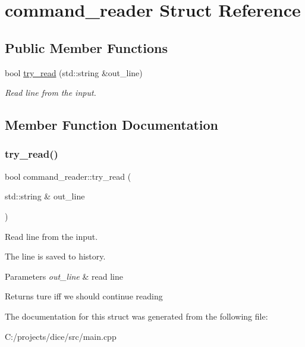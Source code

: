 \hypertarget{structcommand__reader}{}\section{command\+\_\+reader Struct Reference}
\label{structcommand__reader}
\subsection*{Public Member Functions}
\begin{DoxyCompactItemize}
\item 
bool \mbox{\hyperlink{structcommand__reader_aefd772702c6cca30efb2a932910e51cc}{try\+\_\+read}} (std\+::string \&out\+\_\+line)
\begin{DoxyCompactList}\small\item\em Read line from the input. \end{DoxyCompactList}\end{DoxyCompactItemize}


\subsection{Member Function Documentation}
\mbox{\label{structcommand__reader_aefd772702c6cca30efb2a932910e51cc}} 
\subsubsection{\texorpdfstring{try\+\_\+read()}{try\_read()}}
{\footnotesize\ttfamily bool command\+\_\+reader\+::try\+\_\+read (\begin{DoxyParamCaption}\item[{std\+::string \&}]{out\+\_\+line }\end{DoxyParamCaption})\hspace{0.3cm}{\ttfamily [inline]}}



Read line from the input. 

The line is saved to history. 
\begin{DoxyParams}{Parameters}
{\em out\+\_\+line} & read line \\
\hline
\end{DoxyParams}
\begin{DoxyReturn}{Returns}
ture iff we should continue reading 
\end{DoxyReturn}


The documentation for this struct was generated from the following file\+:\begin{DoxyCompactItemize}
\item 
C\+:/projects/dice/src/main.\+cpp\end{DoxyCompactItemize}
